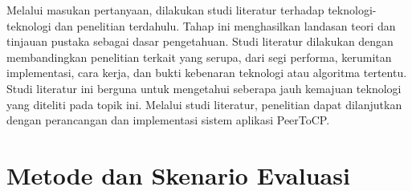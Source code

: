 Melalui masukan pertanyaan, dilakukan studi literatur terhadap teknologi-teknologi dan penelitian terdahulu. Tahap ini menghasilkan landasan teori dan tinjauan pustaka sebagai dasar pengetahuan. Studi literatur dilakukan dengan membandingkan penelitian terkait yang serupa, dari segi performa, kerumitan implementasi, cara kerja, dan bukti kebenaran teknologi atau algoritma tertentu. Studi literatur ini berguna untuk mengetahui seberapa jauh kemajuan teknologi yang diteliti pada topik ini. Melalui studi literatur, penelitian dapat dilanjutkan dengan perancangan dan implementasi sistem aplikasi PeerToCP.



\section{Metode dan Skenario Evaluasi}

